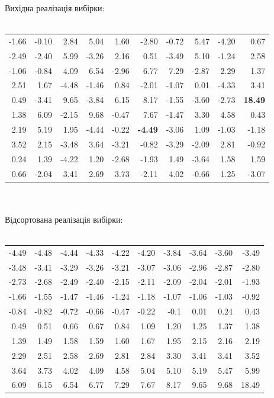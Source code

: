 \documentclass[14pt,a4paper]{scrartcl}
\begin{document}
Вихідна реалізація вибірки:\\\\
\begin{tabular}{r r r r r r r r r r}
-1.66 & -0.10 & 2.84 & 5.04 & 1.60 & -2.80 & -0.72 & 5.47 & -4.20 & 0.67\\
-2.49 & -2.40 & 5.99 & -3.26 & 2.16 & 0.51 & -3.49 & 5.10 & -1.24 & 2.58\\
-1.06 & -0.84 & 4.09 & 6.54 & -2.96 & 6.77 & 7.29 & -2.87 & 2.29 & 1.37\\
2.51 & 1.67 & -4.48 & -1.46 & 0.84 & -2.01 & -1.07 & 0.01 & -4.33 & 3.41\\
0.49 & -3.41 & 9.65 & -3.84 & 6.15 & 8.17 & -1.55 & -3.60 & -2.73 & \textbf{18.49}\\
1.38 & 6.09 & -2.15 & 9.68 & -0.47 & 7.67 & -1.47 & 3.30 & 4.58 & 0.43\\
2.19 & 5.19 & 1.95 & -4.44 & -0.22 & \textbf{-4.49} & -3.06 & 1.09 & -1.03 & -1.18\\
3.52 & 2.15 & -3.48 & 3.64 & -3.21 & -0.82 & -3.29 & -2.09 & 2.81 & -0.92\\
0.24 & 1.39 & -4.22 & 1.20 & -2.68 & -1.93 & 1.49 & -3.64 & 1.58 & 1.59\\
0.66 & -2.04 & 3.41 & 2.69 & 3.73 & -2.11 & 4.02 & -0.66 & 1.25 & -3.07
\end{tabular}\\\\

Відсортована реалізація вибірки:\\\\
\begin{tabular}{r r r r r r r r r r}
-4.49 & -4.48 & -4.44 & -4.33 & -4.22 & -4.20 & -3.84 & -3.64 & -3.60 & -3.49\\
-3.48 & -3.41 & -3.29 & -3.26 & -3.21 & -3.07 & -3.06 & -2.96 & -2.87 & -2.80\\
-2.73 & -2.68 & -2.49 & -2.40 & -2.15 & -2.11 & -2.09 & -2.04 & -2.01 & -1.93\\
-1.66 & -1.55 & -1.47 & -1.46 & -1.24 & -1.18 & -1.07 & -1.06 & -1.03 & -0.92\\
-0.84 & -0.82 & -0.72 & -0.66 & -0.47 & -0.22 & -0.1 & 0.01 & 0.24 & 0.43\\
0.49 & 0.51 & 0.66 & 0.67 & 0.84 & 1.09 & 1.20 & 1.25 & 1.37 & 1.38\\
1.39 & 1.49 & 1.58 & 1.59 & 1.60 & 1.67 & 1.95 & 2.15 & 2.16 & 2.19\\
2.29 & 2.51 & 2.58 & 2.69 & 2.81 & 2.84 & 3.30 & 3.41 & 3.41 & 3.52\\
3.64 & 3.73 & 4.02 & 4.09 & 4.58 & 5.04 & 5.10 & 5.19 & 5.47 & 5.99\\
6.09 & 6.15 & 6.54 & 6.77 & 7.29 & 7.67 & 8.17 & 9.65 & 9.68 & 18.49
\end{tabular}\newpage
\end{document}
